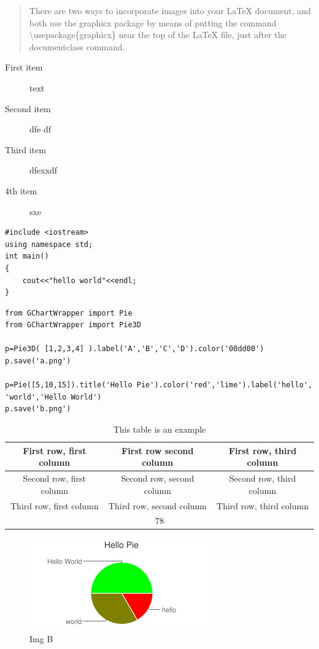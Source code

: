 \documentclass{ctexart}
\begin{document}
\begin{CJK*}{GBK}{song}
\begin{quote}
There are two ways to incorporate images into your LaTeX document, and both use the graphicx package by means of putting the command \textbackslash usepackage\{graphicx\} near the top of the LaTeX file, just after the documentclass command.
\end{quote}

\begin{description}
\item[First item] text
\item[Second item] dfe df
\item[Third item] dfexxdf
\item[4th item] sxe
\end{description}

\makebox[\textwidth]{\hrulefill}
\begin{verbatim}
#include <iostream>
using namespace std;
int main()
{
    cout<<"hello world"<<endl;
}
\end{verbatim}
\makebox[\textwidth]{\hrulefill}
\begin{verbatim}
from GChartWrapper import Pie
from GChartWrapper import Pie3D

p=Pie3D( [1,2,3,4] ).label('A','B','C','D').color('00dd00')
p.save('a.png')

p=Pie([5,10,15]).title('Hello Pie').color('red','lime').label('hello', 'world','Hello World')
p.save('b.png')
\end{verbatim}
\makebox[\textwidth]{\hrulefill}


\begin{table}[hbtp]
\caption{This table is an example}
\begin{center}
\begin{tabular}{c|c|c}
First row, first column & First row second column & First row, third column \\ \hline
Second row, first column & Second row, second column & Second row, third column \\
Third row, first column & Third row, second column & Third row, third column \\
\multicolumn{3}{c}{78}
\end{tabular}
\end{center}
\label{exampletable}
\end{table}



\begin{figure}[hbtp]
\caption{Img B}
\begin{center}
\includegraphics[scale=0.75]{b.png}
\end{center}
\label{fig1}
\end{figure}


\end{CJK*}
\end{document}
